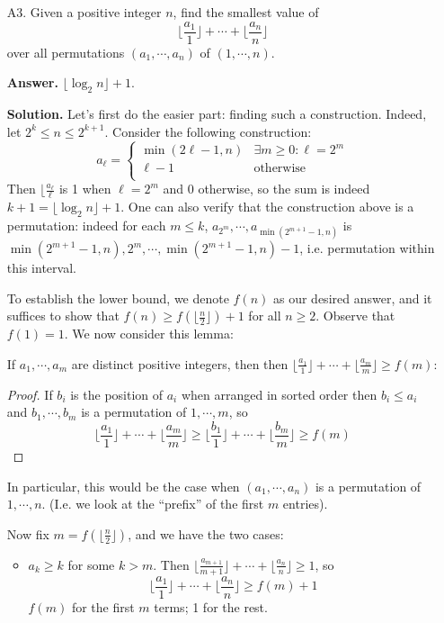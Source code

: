 \documentclass[11pt,a4paper]{article}
\begin{document}
\begin{enumerate}
		\item [A3.] Given a positive integer $n$, find the smallest value of 
		\[
		\lfloor \frac {a_1}{1}\rfloor + \cdots + \lfloor \frac {a_n}{n}\rfloor
		\]
		over all permutations $(a_1, \cdots, a_n)$ of $(1, \cdots, n)$. 
		
		\textbf{Answer.} $\lfloor \log_2 n\rfloor + 1$. 
		
		\textbf{Solution.} Let's first do the easier part: 
		finding such a construction. 
		Indeed, let $2^k\le n\le 2^{k+1}$. 
		Consider the following construction: 
		\[
		a_\ell = 
		\begin{cases}
			\min(2\ell - 1, n) & \exists m\ge 0: \ell = 2^m\\
			\ell - 1 & \text{otherwise}\\
		\end{cases}
		\]
		Then $\lfloor \frac{a_{\ell}}{\ell}$ is 1 when $\ell=2^m$ and 0 otherwise, so the sum is indeed $k + 1 = \lfloor \log_2 n \rfloor + 1$. 
		One can also verify that the construction above is a permutation: 
		indeed for each $m\le k$, $a_{2^m}, \cdots, a_{\min(2^{m+1}-1, n)}$ is 
		$\min(2^{m+1}-1, n), 2^m, \cdots, \min(2^{m+1}-1, n) - 1$, 
		i.e. permutation within this interval. 
		
		To establish the lower bound, we denote $f(n)$ as our desired answer, and it suffices to show that $f(n)\ge f(\lfloor \frac n2\rfloor) + 1$ for all $n\ge 2$. 
		Observe that $f(1) = 1$. 
		We now consider this lemma: 
		\begin{lemma}\label{lemma_a3}
			If $a_1, \cdots, a_m$ are distinct positive integers, then
			then 
			$\lfloor \frac {a_1}{1}\rfloor + \cdots + \lfloor \frac {a_m}{m}\rfloor\ge f(m)$: 
		\end{lemma}
	    \begin{proof}
	    	If $b_i$ is the position of $a_i$ when arranged in sorted order then $b_i\le a_i$ and 
	    	$b_1, \cdots, b_m$ is a permutation of $1, \cdots, m$, 
	    	so 
	    	\[
	    	\lfloor \frac {a_1}{1}\rfloor + \cdots + \lfloor \frac {a_m}{m}\rfloor
	    	\ge 
	    	\lfloor \frac {b_1}{1}\rfloor + \cdots + \lfloor \frac {b_m}{m}\rfloor
	    	\ge f(m)
	    	\]
	    \end{proof}
		
		In particular, this would be the case when $(a_1, \cdots, a_n)$ is a permutation of $1, \cdots, n$. 
		(I.e. we look at the ``prefix'' of the first $m$ entries). 
		
		Now fix $m=f(\lfloor \frac n2\rfloor)$, and we have the two cases: 
		\begin{itemize}
			\item $a_k\ge k$ for some $k > m$. 
			Then $\lfloor \frac {a_{m+1}}{m+1}\rfloor + \cdots + \lfloor \frac {a_n}{n}\rfloor\ge 1$, 
			so 
			\[
			\lfloor \frac {a_1}{1}\rfloor + \cdots + \lfloor \frac {a_n}{n}\rfloor
			\ge f(m) + 1
			\]
			$f(m)$ for the first $m$ terms; 1 for the rest. 
			

\end{itemize}
\end{enumerate}
\end{document}
